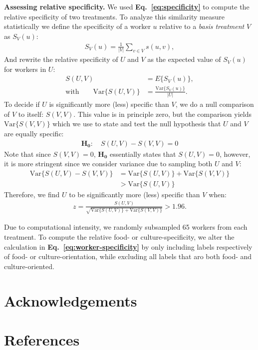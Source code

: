 \documentclass[a4paper]{report}
\begin{document}
\textbf{Assessing relative specificity.}
We used \textbf{Eq.~\ref{eq:specificity}} to compute the relative specificity
of two treatments.  To analyze this similarity measure statistically
we define the specificity of a worker $u$ relative to a 
\textit{basis treatment} $V$ as $S_V(u)$:
\begin{align}
S_V(u) = \frac{1}{|V|} \sum_{v \in V} s(u,v),
\end{align}
And rewrite the relative specificity of $U$ and $V$ as the expected value of
$S_V(u)$ for workers in $U$:
\begin{align}
	S(U,V) &= E\{S_V(u)\}, \\
	\text{with} \quad\quad \text{Var}\{S(U,V)\} 
		&= \frac{\text{Var}\{S_V(u)\}}{|U|}.
\end{align}
To decide if $U$ is significantly more (less) specific than $V$, we do
a null comparison of $V$ to itself: $S(V,V)$.  This value is in principle zero,
but the comparison yields $\text{Var}\{S(V,V)\}$ which we use to state and 
test the null hypothesis that $U$ and $V$ are equally specific:
\begin{align}
	\mathbf{H_0}: \quad S(U,V)-S(V,V)=0
\end{align}
Note that since $S(V,V)=0$, $\mathbf{H_0}$ essentially states that $S(U,V)=0$,
however, it is more stringent since we consider variance due to sampling both
$U$ and $V$:
\begin{align}
\text{Var}\{S(U,V) - S(V,V)\} &= \text{Var}\{S(U,V)\} + \text{Var}\{S(V,V)\}\\
						&> \text{Var}\{S(U,V)\}
\end{align}
Therefore, we find $U$ to be significantly more (less) specific than $V$ when:
\begin{align}
z = \frac{S(U,V)}{ \sqrt{ \text{Var}\{S(U,V)\} + \text{Var}\{S(V,V)\} }} 
	> 1.96.
\end{align}

Due to 
computational intensity, we randomly subsampled 65 workers from each treatment.
To compute the relative food- or culture-specificity, we alter the calculation
in \textbf{Eq.~\ref{eq:worker-specificity}} by only including labels 
respectively of food- or culture-orientation, while excluding all labels that
aro both food- and culture-oriented.



\section*{Acknowledgements}
\section*{References}
\begingroup
\renewcommand{\chapter}[2]{}

\endgroup
 
\end{document}
